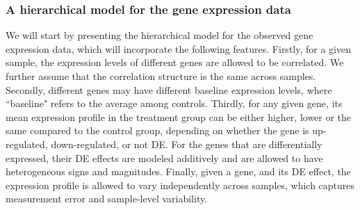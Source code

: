 \documentclass[a4,center,fleqn]{NAR}
\begin{document}
	\subsubsection{A hierarchical model for the gene expression data}\label{subsection:YModel}
	We will start by presenting the hierarchical model for the observed gene expression data, which
	will incorporate the following features. 
	Firstly, for a given sample, the expression levels of different genes are allowed to be
	correlated. We further assume that the correlation structure is the same across samples. Secondly,
	different genes may have different baseline expression levels, where ``baseline" refers to the
	average among controls. Thirdly, for any given gene, its mean expression profile in the treatment
	group can be either higher, lower or the same compared to the control group, depending on whether
	the gene is up-regulated, down-regulated, or not DE. For the genes that are differentially
	expressed, their DE effects are modeled additively and are allowed to have heterogeneous signs and
	magnitudes. Finally, given a gene, and its DE effect, the expression profile is allowed to vary
	independently across samples, which captures measurement error and sample-level variability.
	
\end{document}
